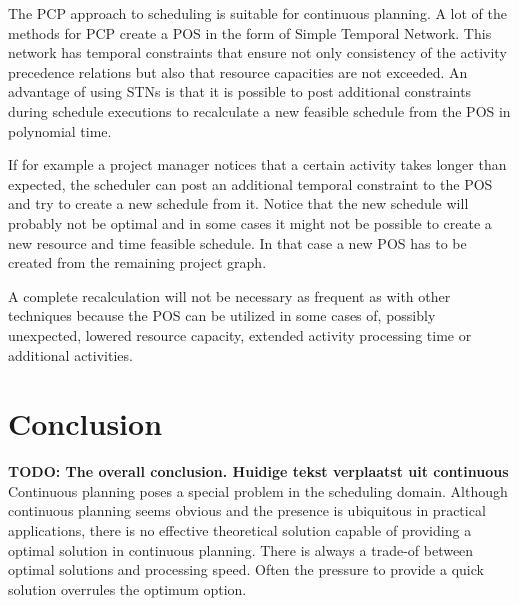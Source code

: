 \documentclass{article}
\newcommand{\TODO}[1]{{\color{red}\textbf{TODO: #1}}}
\begin{document}
The PCP approach to scheduling is suitable for continuous planning. A lot of the methods for PCP create a POS in the form of Simple Temporal Network. This network has temporal constraints that ensure not only consistency of the activity precedence relations but also that resource capacities are not exceeded. An advantage of using STNs is that it is possible to post additional constraints during schedule executions to recalculate a new feasible schedule from the POS in polynomial time. 

If for example a project manager notices that a certain activity takes longer than expected, the scheduler can post an additional temporal constraint to the POS and try to create a new schedule from it. Notice that the new schedule will probably not be optimal and in some cases it might not be possible to create a new resource and time feasible schedule. In that case a new POS has to be created from the remaining project graph. 

A complete recalculation will not be necessary as frequent as with other techniques because the POS can be utilized in some cases of, possibly unexpected, lowered resource capacity, extended activity processing time or additional activities. 

\section{Conclusion}
\TODO{The overall conclusion. Huidige tekst verplaatst uit continuous}
Continuous planning poses a special problem in the scheduling domain.
Although continuous planning seems obvious and the presence is ubiquitous in practical applications, there is no effective theoretical solution capable of providing a optimal solution in continuous planning.
There is always a trade-of between optimal solutions and processing speed.
Often the pressure to provide a quick solution overrules the optimum option.



\end{document}
